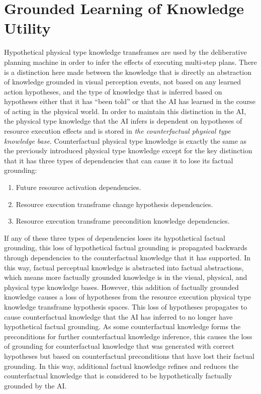 \chapter{Grounded Learning of Knowledge Utility}
\label{chapter:grounded_learning_of_knowledge_utility}


Hypothetical physical type knowledge transframes are used by the
deliberative planning machine in order to infer the effects of
executing multi-step plans.  There is a distinction here made between
the knowledge that is directly an abstraction of knowledge grounded in
visual perception events, not based on any learned action hypotheses,
and the type of knowledge that is inferred based on hypotheses either
that it has ``been told'' or that the AI has learned in the course of
acting in the physical world.  In order to maintain this distinction
in the AI, the physical type knowledge that the AI infers is dependent
on hypotheses of resource execution effects and is stored in \emph{the
  counterfactual physical type knowledge base}.  Counterfactual
physical type knowledge is exactly the same as the previously
introduced physical type knowledge except for the key distinction that
it has three types of dependencies that can cause it to lose its
factual grounding:
\begin{enumerate}
\item Future resource activation dependencies.
\item Resource execution transframe change hypothesis dependencies.
\item Resource execution transframe precondition knowledge dependencies.
\end{enumerate}
If any of these three types of dependencies loses its hypothetical
factual grounding, this loss of hypothetical factual grounding is
propagated backwards through dependencies to the counterfactual
knowledge that it has supported.  In this way, factual perceptual
knowledge is abstracted into factual abstractions, which means more
factually grounded knowledge is in the visual, physical, and physical
type knowledge bases.  However, this addition of factually grounded
knowledge causes a loss of hypotheses from the resource execution
physical type knowledge transframe hypothesis spaces.  This loss of
hypotheses propagates to cause counterfactual knowledge that the AI
has inferred to no longer have hypothetical factual grounding.  As
some counterfactual knowledge forms the preconditions for further
counterfactual knowledge inference, this causes the loss of grounding
for counterfactual knowledge that was generated with correct
hypotheses but based on counterfactual preconditions that have lost
their factual grounding.  In this way, additional factual knowledge
refines and reduces the counterfactual knowledge that is considered to
be hypothetically factually grounded by the AI.
